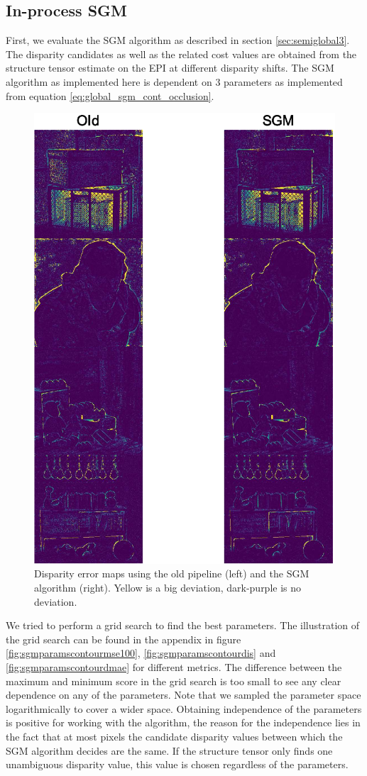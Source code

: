 \documentclass  [
  paper    = a4,
  BCOR     = 10mm,
  twoside,
  fontsize = 12pt,
  fleqn,
  toc      = bibnumbered,
  toc      = listofnumbered,
  numbers  = noendperiod,
  headings = normal,
  listof   = leveldown,
  version  = 3.03
]                                       {scrreprt}
\begin{document}
\subsection{In-process SGM}
First, we evaluate the SGM algorithm as described in section \ref{sec:semiglobal3}. The disparity candidates as well as the related cost values are obtained from the structure tensor estimate on the EPI at different disparity shifts.
The SGM algorithm as implemented here is dependent on 3 parameters as implemented  from equation \ref{eq:global_sgm_cont_occlusion}.
 \begin{figure}[h!]
	\centering
	\includegraphics[width=0.7\linewidth]{images/sgm_results_thresh}
	\caption[Semi-global matching results]{Disparity error maps using the old pipeline (left) and the SGM algorithm (right). Yellow is a big deviation, dark-purple is no deviation.}
	\label{fig:sgmresultsthresh}
\end{figure}
We tried to perform a grid search to find the best parameters. The illustration of the grid search can be found in the appendix in figure \ref{fig:sgmparamscontourmse100}, \ref{fig:sgmparamscontourdis} and \ref{fig:sgmparamscontourdmae} for different metrics. The difference between the maximum and minimum score in the grid search is too small to see any clear dependence on any of the parameters. Note that we sampled the parameter space logarithmically to cover a wider space. Obtaining independence of the parameters is positive for working with the algorithm, the reason for the independence lies in the fact that at most pixels the candidate disparity values between which the SGM algorithm decides are the same. If the structure tensor only finds one unambiguous disparity value, this value is chosen regardless of the parameters.
\end{document}
